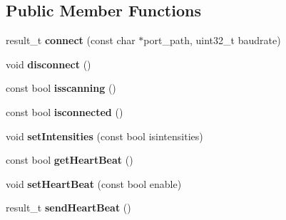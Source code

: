 \subsection*{Public Member Functions}
\begin{DoxyCompactItemize}
\item 
result\+\_\+t {\bfseries connect} (const char $\ast$port\+\_\+path, uint32\+\_\+t baudrate)\hypertarget{classydlidar_1_1_y_dlidar_driver_a2c5eeecccaa6ed874635de1617e8d7d8}{}\label{classydlidar_1_1_y_dlidar_driver_a2c5eeecccaa6ed874635de1617e8d7d8}

\item 
void {\bfseries disconnect} ()\hypertarget{classydlidar_1_1_y_dlidar_driver_aa26790ae49d33936229fa67739a8ff5f}{}\label{classydlidar_1_1_y_dlidar_driver_aa26790ae49d33936229fa67739a8ff5f}

\item 
const bool {\bfseries isscanning} ()\hypertarget{classydlidar_1_1_y_dlidar_driver_ab6e35a7ba1eea55dc7ff1d03e0de9a46}{}\label{classydlidar_1_1_y_dlidar_driver_ab6e35a7ba1eea55dc7ff1d03e0de9a46}

\item 
const bool {\bfseries isconnected} ()\hypertarget{classydlidar_1_1_y_dlidar_driver_ad4eee87f94cdbeabb3866b7dca08249f}{}\label{classydlidar_1_1_y_dlidar_driver_ad4eee87f94cdbeabb3866b7dca08249f}

\item 
void {\bfseries set\+Intensities} (const bool isintensities)\hypertarget{classydlidar_1_1_y_dlidar_driver_a406ae191df8a2a2fa90de4175cfe9d4c}{}\label{classydlidar_1_1_y_dlidar_driver_a406ae191df8a2a2fa90de4175cfe9d4c}

\item 
const bool {\bfseries get\+Heart\+Beat} ()\hypertarget{classydlidar_1_1_y_dlidar_driver_acbfb9ad990b09902afee8d868a473f68}{}\label{classydlidar_1_1_y_dlidar_driver_acbfb9ad990b09902afee8d868a473f68}

\item 
void {\bfseries set\+Heart\+Beat} (const bool enable)\hypertarget{classydlidar_1_1_y_dlidar_driver_ab2bf62735be18019864c12f0e462c4a2}{}\label{classydlidar_1_1_y_dlidar_driver_ab2bf62735be18019864c12f0e462c4a2}

\item 
result\+\_\+t {\bfseries send\+Heart\+Beat} ()\hypertarget{classydlidar_1_1_y_dlidar_driver_a6e7dc7cd2a73d24a763cebde840a5d30}{}\label{classydlidar_1_1_y_dlidar_driver_a6e7dc7cd2a73d24a763cebde840a5d30}


\end{DoxyCompactItemize}
